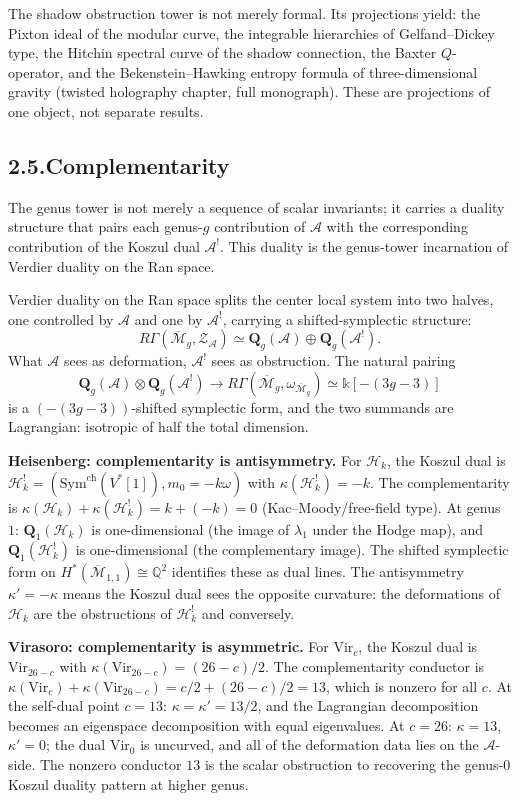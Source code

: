 \documentclass[11pt,reqno]{amsart}
\theoremstyle{definition}
\theoremstyle{remark}
\providecommand{\cA}{\mathcal{A}}
\providecommand{\cH}{\mathcal{H}}
\providecommand{\cM}{\mathcal{M}}
\providecommand{\Sym}{\mathrm{Sym}}
\providecommand{\Vir}{\mathrm{Vir}}
\providecommand{\bQ}{\mathbb{Q}}
\providecommand{\Bbbk}{\mathbb{k}}
\numberwithin{equation}{section}
\begin{document}
The shadow obstruction tower is not merely formal. Its projections
yield: the Pixton ideal of the modular curve, the integrable
hierarchies of Gelfand--Dickey type, the Hitchin spectral curve of
the shadow connection, the Baxter $Q$-operator, and the
Bekenstein--Hawking entropy formula of three-dimensional gravity
(twisted holography chapter, full monograph). These are
projections of one object, not separate results.

\subsection*{2.5.\enspace Complementarity}

The genus tower is not merely a sequence of scalar invariants; it
carries a duality structure that pairs each genus-$g$ contribution
of $\cA$ with the corresponding contribution of the Koszul dual
$\cA^!$. This duality is the genus-tower incarnation of Verdier
duality on the Ran space.

Verdier duality on the Ran space splits the center local system into
two halves, one controlled by $\cA$ and one by $\cA^!$, carrying a
shifted-symplectic structure:
\[
R\Gamma(\overline{\mathcal M}_g,\mathcal Z_\cA)\simeq\mathbf Q_g(\cA)\oplus\mathbf Q_g(\cA^!).
\]
What $\cA$ sees as deformation, $\cA^!$ sees as obstruction. The
natural pairing
\[
\mathbf Q_g(\cA)\otimes\mathbf Q_g(\cA^!)\to R\Gamma(\overline{\mathcal M}_g,\omega_{\overline{\mathcal M}_g})\simeq\Bbbk[-(3g-3)]
\]
is a $(-(3g-3))$-shifted symplectic form, and the two summands are
Lagrangian: isotropic of half the total dimension.

\medskip
\noindent\textbf{Heisenberg: complementarity is antisymmetry.}\enspace
For $\cH_k$, the Koszul dual is
$\cH_k^!=(\Sym^{\mathrm{ch}}(V^*[1]),m_0=-k\omega)$
with $\kappa(\cH_k^!)=-k$. The complementarity is
$\kappa(\cH_k)+\kappa(\cH_k^!)=k+(-k)=0$ (Kac--Moody/free-field type).
At genus~$1$: $\mathbf Q_1(\cH_k)$ is one-dimensional (the image of
$\lambda_1$ under the Hodge map), and $\mathbf Q_1(\cH_k^!)$ is
one-dimensional (the complementary image). The shifted symplectic
form on $H^*(\overline{\cM}_{1,1})\cong\bQ^2$ identifies these as
dual lines. The antisymmetry $\kappa'=-\kappa$ means the Koszul dual
sees the opposite curvature: the deformations of $\cH_k$ are the
obstructions of $\cH_k^!$ and conversely.

\medskip
\noindent\textbf{Virasoro: complementarity is asymmetric.}\enspace
For $\Vir_c$, the Koszul dual is $\Vir_{26-c}$ with
$\kappa(\Vir_{26-c})=(26-c)/2$. The complementarity conductor is
$\kappa(\Vir_c)+\kappa(\Vir_{26-c})=c/2+(26-c)/2=13$, which is
nonzero for all $c$. At the self-dual point $c=13$:
$\kappa=\kappa'=13/2$, and the Lagrangian decomposition becomes
an eigenspace decomposition with equal eigenvalues. At $c=26$:
$\kappa=13$, $\kappa'=0$; the dual $\Vir_0$ is uncurved, and all
of the deformation data lies on the $\cA$-side. The nonzero
conductor $13$ is the scalar obstruction to recovering the
genus-$0$ Koszul duality pattern at higher genus.
\end{document}

